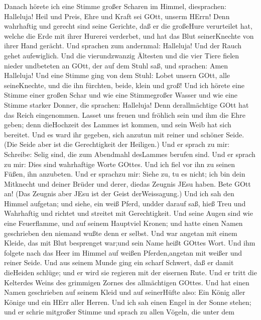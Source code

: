  Danach hörete ich eine Stimme großer Scharen im Himmel,
diesprachen: Halleluja! Heil und Preis, Ehre und Kraft sei GOtt, unserm
HErrn!  Denn wahrhaftig und gerecht sind seine Gerichte, daß
er die großeHure verurteilet hat, welche die Erde mit ihrer Hurerei
verderbet, und hat das Blut seinerKnechte von ihrer Hand gerächt.
 Und sprachen zum andernmal: Halleluja! Und der Rauch gehet
aufewiglich.  Und die vierundzwanzig Ältesten und die vier
Tiere fielen nieder undbeteten an GOtt, der auf dem Stuhl saß, und
sprachen: Amen Halleluja!  Und eine Stimme ging von dem
Stuhl: Lobet unsern GOtt, alle seineKnechte, und die ihn fürchten,
beide, klein und groß!  Und ich hörete eine Stimme einer
großen Schar und wie eine Stimmegroßer Wasser und wie eine Stimme
starker Donner, die sprachen: Halleluja! Denn derallmächtige GOtt hat
das Reich eingenommen.  Lasset uns freuen und fröhlich sein
und ihm die Ehre geben; denn dieHochzeit des Lammes ist kommen, und sein
Weib hat sich bereitet.  Und es ward ihr gegeben, sich
anzutun mit reiner und schöner Seide.(Die Seide aber ist die
Gerechtigkeit der Heiligen.)  Und er sprach zu mir:
Schreibe: Selig sind, die zum Abendmahl desLammes berufen sind. Und er
sprach zu mir: Dies sind wahrhaftige Worte GOttes.  Und ich
fiel vor ihn zu seinen Füßen, ihn anzubeten. Und er sprachzu mir: Siehe
zu, tu es nicht; ich bin dein Mitknecht und deiner Brüder und derer,
diedas Zeugnis JEsu haben. Bete GOtt an! (Das Zeugnis aber JEsu ist der
Geist derWeissagung.)  Und ich sah den Himmel aufgetan; und
siehe, ein weiß Pferd, undder darauf saß, hieß Treu und Wahrhaftig und
richtet und streitet mit Gerechtigkeit.  Und seine Augen
sind wie eine Feuerflamme, und auf seinem Hauptviel Kronen; und hatte
einen Namen geschrieben den niemand wußte denn er selbst. 
Und war angetan mit einem Kleide, das mit Blut besprenget war;und sein
Name heißt GOttes Wort.  Und ihm folgete nach das Heer im
Himmel auf weißen Pferden,angetan mit weißer und reiner Seide.
 Und aus seinem Munde ging ein scharf Schwert, daß er damit
dieHeiden schlüge; und er wird sie regieren mit der eisernen Rute. Und
er tritt die Kelterdes Weins des grimmigen Zornes des allmächtigen
GOttes.  Und hat einen Namen geschrieben auf seinem Kleid
und auf seinerHüfte also: Ein König aller Könige und ein HErr aller
Herren.  Und ich sah einen Engel in der Sonne stehen; und
er schrie mitgroßer Stimme und sprach zu allen Vögeln, die unter dem
